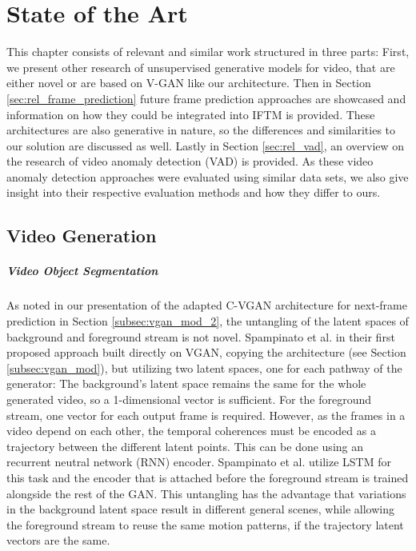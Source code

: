\chapter{State of the Art} \label{chap:state_of_the_art} %

This chapter consists of relevant and similar work structured in three parts: First, we present other research of unsupervised generative models for video, that are either novel or are based on V-GAN like our architecture. Then in Section \ref{sec:rel_frame_prediction} future frame prediction approaches are showcased and information on how they could be integrated into IFTM is provided. These architectures are also generative in nature, so the differences and similarities to our solution are discussed as well. Lastly in Section \ref{sec:rel_vad}, an overview on the research of video anomaly detection (VAD) is provided. As these video anomaly detection approaches were evaluated using similar data sets, we also give insight into their respective evaluation methods and how they differ to ours. 



\section{Video Generation} \label{sec:rel_vgan}

\paragraph{Video Object Segmentation} 
As noted in our presentation of the adapted C-VGAN architecture for next-frame prediction in Section \ref{subsec:vgan_mod_2}, the untangling of the latent spaces of background and foreground stream is not novel. Spampinato et al. in their first proposed approach \cite{spampinato2018vos} built directly on VGAN, copying the architecture (see Section \ref{subsec:vgan_mod}), but utilizing two latent spaces, one for each pathway of the generator: The background's latent space remains the same for the whole generated video, so a 1-dimensional vector is sufficient. For the foreground stream, one vector for each output frame is required. However, as the frames in a video depend on each other, the temporal coherences must be encoded as a trajectory between the different latent points. This can be done using an recurrent neutral network (RNN) encoder. Spampinato et al. utilize LSTM \cite{hochreiter1997long} for this task and the encoder that is attached before the foreground stream is trained alongside the rest of the GAN. This untangling has the advantage that variations in the background latent space result in different general scenes, while allowing the foreground stream to reuse the same motion patterns, if the trajectory latent vectors are the same.

